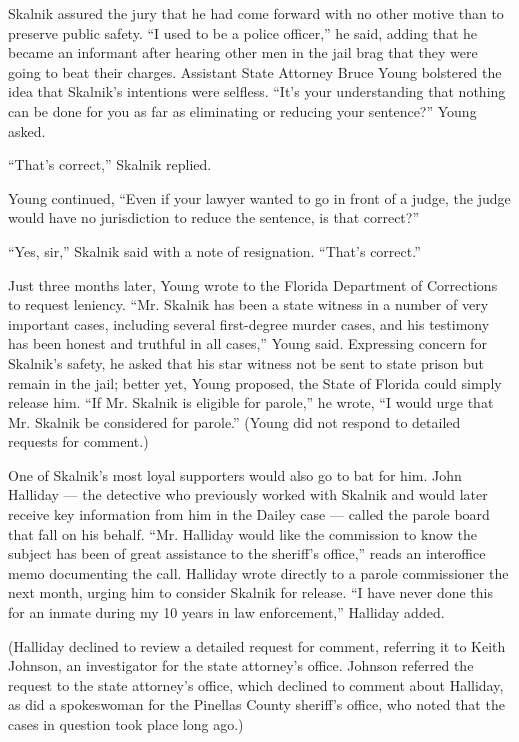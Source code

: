 Skalnik assured the jury that he had come forward with no other motive
than to preserve public safety. ``I used to be a police officer,'' he
said, adding that he became an informant after hearing other men in the
jail brag that they were going to beat their charges. Assistant State
Attorney Bruce Young bolstered the idea that Skalnik's intentions were
selfless. ``It's your understanding that nothing can be done for you as
far as eliminating or reducing your sentence?'' Young asked.

``That's correct,'' Skalnik replied.

Young continued, ``Even if your lawyer wanted to go in front of a judge,
the judge would have no jurisdiction to reduce the sentence, is that
correct?''

``Yes, sir,'' Skalnik said with a note of resignation. ``That's
correct.''

Just three months later, Young wrote to the Florida Department of
Corrections to request leniency. ``Mr. Skalnik has been a state witness
in a number of very important cases, including several first-degree
murder cases, and his testimony has been honest and truthful in all
cases,'' Young said. Expressing concern for Skalnik's safety, he asked
that his star witness not be sent to state prison but remain in the
jail; better yet, Young proposed, the State of Florida could simply
release him. ``If Mr. Skalnik is eligible for parole,'' he wrote, ``I
would urge that Mr. Skalnik be considered for parole.'' (Young did not
respond to detailed requests for comment.)

One of Skalnik's most loyal supporters would also go to bat for him.
John Halliday --- the detective who previously worked with Skalnik and
would later receive key information from him in the Dailey case ---
called the parole board that fall on his behalf. ``Mr. Halliday would
like the commission to know the subject has been of great assistance to
the sheriff's office,'' reads an interoffice memo documenting the call.
Halliday wrote directly to a parole commissioner the next month, urging
him to consider Skalnik for release. ``I have never done this for an
inmate during my 10 years in law enforcement,'' Halliday added.

(Halliday declined to review a detailed request for comment, referring
it to Keith Johnson, an investigator for the state attorney's office.
Johnson referred the request to the state attorney's office, which
declined to comment about Halliday, as did a spokeswoman for the
Pinellas County sheriff's office, who noted that the cases in question
took place long ago.)

